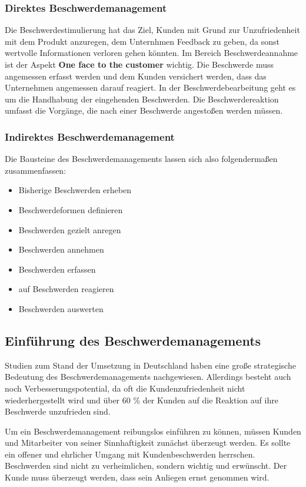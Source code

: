 \documentclass[a4paper,12pt]{article}
\begin{document}
	\subsubsection{Direktes Beschwerdemanagement}
	Die Beschwerdestimulierung hat das Ziel, Kunden mit Grund zur Unzufriedenheit mit dem Produkt anzuregen, dem Unternhmen Feedback zu geben, da sonst wertvolle Informationen verloren gehen könnten. Im Bereich Beschwerdeannahme ist der Aspekt \textbf{One face to the customer} wichtig. Die Beschwerde muss angemessen erfasst werden und dem Kunden versichert werden, dass das Unternehmen angemessen darauf reagiert. In der Beschwerdebearbeitung geht es um die Handhabung der eingehenden Beschwerden. Die Beschwerdereaktion umfasst die Vorgänge, die nach einer Beschwerde angestoßen werden müssen.  {\cite{Gabler}}
	\subsubsection{Indirektes Beschwerdemanagement}
	Die Bausteine des Beschwerdemanagements lassen sich also folgendermaßen zusammenfassen:
	\begin{itemize}
		\item Bisherige Beschwerden erheben
		\item Beschwerdeformen definieren
		\item Beschwerden gezielt anregen
		\item Beschwerden annehmen
		\item Beschwerden erfassen
		\item auf Beschwerden reagieren
		\item Beschwerden auswerten
	\end{itemize}
	\subsection{Einführung des Beschwerdemanagements}
	Studien zum Stand der Umsetzung in Deutschland haben eine große strategische Bedeutung des Beschwerdemanagements nachgewiesen. Allerdings besteht auch noch Verbesserungspotential, da oft die Kundenzufriedenheit nicht wiederhergestellt wird und über 60 \% der Kunden auf die Reaktion auf ihre Beschwerde unzufrieden sind.  \cite{Gabler}
	
	Um ein Beschwerdemanagement reibungslos einführen zu können, müssen Kunden und Mitarbeiter von seiner Sinnhaftigkeit zunächst überzeugt werden. Es sollte ein offener und ehrlicher Umgang mit Kundenbeschwerden herrschen. Beschwerden sind nicht zu verheimlichen, sondern wichtig und erwünscht. Der Kunde muss überzeugt werden, dass sein Anliegen ernst genommen wird. \cite{Franke.}
	\nocite{Wikipedia}
	\nocite{Gabler}
	\nocite{Complaints}
	\nocite{Franke}
	\newpage
	\printbibliography
\end{document}

